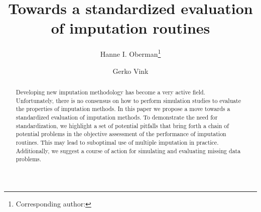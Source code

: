 \documentclass[bimj,fleqn]{w-art}
\begin{document}

\title[Standardized evaluation]{Towards a standardized evaluation of imputation routines}
\author[Oberman]{Hanne I. Oberman\footnote{Corresponding author: {}}} 
\address[\inst{1}]{Departement of Methodology \& Statistics, Padualaan 14, 3584 CH Utrecht, The Netherlands}
\author[Vink]{Gerko Vink}
   

\begin{abstract}
Developing new imputation methodology has become a very active field. Unfortunately, there is no consensus on how to perform simulation studies to evaluate the properties of imputation methods. In this paper we propose a move towards a standardized evaluation of imputation methods. To demonstrate the need for standardization, we highlight a set of potential pitfalls that bring forth a chain of potential problems in the objective assessment of the performance of imputation routines. This may lead to suboptimal use of multiple imputation in practice. Additionally, we suggest a course of action for simulating and evaluating missing data problems.
\end{abstract}



\maketitle                   %



\end{document}
